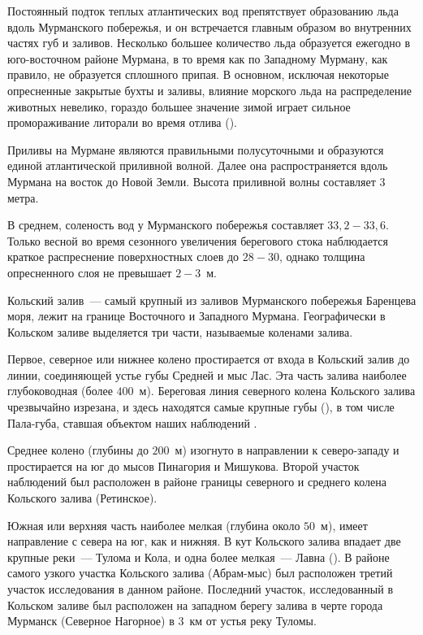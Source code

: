 Постоянный подток теплых атлантических вод препятствует образованию льда вдоль Мурманского побережья, и он встречается главным образом во внутренних частях губ и заливов.
Несколько большее количество льда образуется ежегодно в юго-восточном районе Мурмана, в то время как по Западному Мурману, как правило, не образуется сплошного припая. 
В основном, исключая некоторые опресненные закрытые бухты и заливы, влияние морского льда на распределение животных невелико, гораздо большее значение зимой играет сильное промораживание литорали во время отлива (\cite{Propp_1971}).

Приливы на Мурмане являются правильными полусуточными и образуются единой атлантической приливной волной. 
Далее она распространяется вдоль Мурмана на восток до Новой Земли. 
Высота приливной волны составляет $3$ метра. 

В среднем, соленость вод у Мурманского побережья составляет $33,2 - 33,6$\permil. 
Только весной во время сезонного увеличения берегового стока наблюдается краткое распреснение поверхностных слоев до $28 - 30$\permil, однако толщина опресненного слоя не превышает $2 - 3$~м.

Кольский залив~--- самый крупный из заливов Мурманского побережья Баренцева моря, лежит на границе Восточного и Западного Мурмана.
Географически в Кольском заливе выделяется три части, называемые коленами залива. 

Первое, северное или нижнее колено простирается от входа в Кольский залив до линии, соединяющей устье губы Средней и мыс Лас. 
Эта часть залива наиболее глубоководная (более $400$~м). 
Береговая линия северного колена Кольского залива чрезвычайно изрезана, и  здесь находятся самые крупные губы (\cite{Derugin_1915}), в том числе Пала-губа, ставшая объектом наших наблюдений .


Среднее колено (глубины до $200$~м) изогнуто в направлении к северо-западу и простирается на юг до мысов Пинагория и Мишукова. 
Второй участок наблюдений был расположен в районе границы северного и среднего колена Кольского залива (Ретинское).

Южная или верхняя часть наиболее мелкая (глубина около $50$~м), имеет направление с севера на юг, как и нижняя. 
В кут Кольского залива впадает две крупные реки~--- Тулома и Кола, и одна более мелкая~--- Лавна (\cite{Derugin_1915}).  
В районе самого узкого участка Кольского залива (Абрам-мыс) был расположен третий участок исследования в данном районе.
Последний участок, исследованный в Кольском заливе был расположен на западном берегу залива в черте города Мурманск (Северное Нагорное) в $3$~км от устья реку Туломы.

